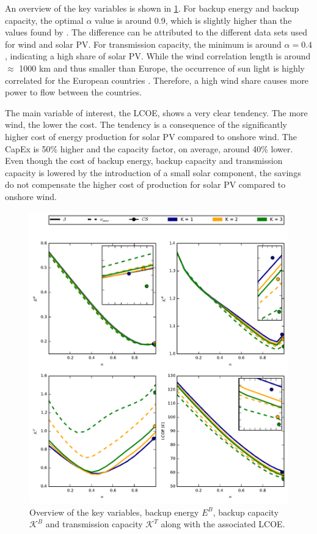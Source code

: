 \documentclass[a4paper, 5p, sort&compress]{elsarticle}%
\begin{document}
An overview of the key variables is shown in \cref{fig:overview}. For
backup energy and backup capacity, the optimal $\alpha$ value is around
0.9, which is slightly higher than the values found by
\cite{Heide2010,Heide2011}. The difference can be attributed to the
different data sets used for wind and solar PV. For transmission
capacity, the minimum is around $\alpha = 0.4$, indicating a high share of
solar PV. While the wind correlation length is around $\approx$ 1000
km \cite{Widen2011} and thus smaller than Europe, the occurrence of
sun light is highly correlated for the European countries
\cite{Timo}. Therefore, a high wind share causes more power to flow
between the countries.

The main variable of interest, the LCOE, shows a very clear
tendency. The more wind, the lower the cost. The tendency is a consequence
of the significantly higher cost of energy production for solar PV
compared to onshore wind. The CapEx is 50\% higher and the capacity
factor, on average, around 40\% lower. Even though the cost of backup
energy, backup capacity and transmission capacity is lowered by the
introduction of a small solar component, the savings do not compensate
the higher cost of production for solar PV compared to onshore wind.

\begin{figure}[p]
  \centering
  \includegraphics[width = 2 \columnwidth]{data}
  \caption{Overview of the key variables, backup energy $E^{B}$,
    backup capacity $\mathcal{K}^{B}$ and transmission capacity
    $\mathcal{K}^{T}$ along with the associated LCOE.}
  \label{fig:overview}
\end{figure}
\end{document}

